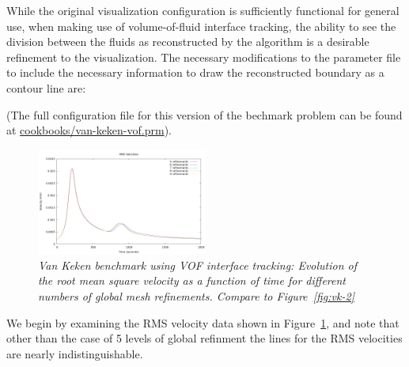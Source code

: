 \documentclass{article}
\begin{document}
% 
% 

While the original visualization configuration is sufficiently functional for
general use, when making use of volume-of-fluid interface tracking, the ability
to see the division between the fluids as reconstructed by the algorithm is a
desirable refinement to the visualization.
The necessary modifications to the parameter file to include the necessary
information to draw the reconstructed boundary as a contour line are:



(The full configuration file for this version of the bechmark problem can be found at \url{cookbooks/van-keken-vof.prm}).

\begin{figure}[htb]
    \centering
    \includegraphics[width=0.5\textwidth]{cookbooks/benchmarks/vof-van-keken/rms_vel_comparison.png}
    \caption{\it Van Keken benchmark using VOF interface tracking: Evolution of
        the root mean square velocity as a function of time for different numbers
    of global mesh refinements.  Compare to Figure~\ref{fig:vk-2}}
    \label{fig:vof-vk-1}
\end{figure}

We begin by examining the RMS velocity data shown in Figure~\ref{fig:vof-vk-1},
and note that other than the case of 5 levels of global refinment the lines for
the RMS velocities are nearly indistinguishable.
\end{document}
